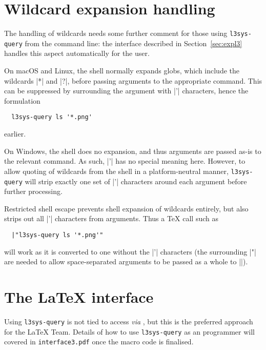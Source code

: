 \documentclass{l3doc}
\begin{document}
\begin{documentation}
\section{Wildcard expansion handling\label{sec:wildcard}}

The handling of wildcards needs some further comment for those using
\texttt{l3sys-query} from the command line: the  interface described
in Section~\ref{sec:expl3} handles this aspect automatically for the user.

On macOS and Linux, the shell normally expands globs, which include the
wildcards |*| and |?|, before passing arguments to the appropriate command. This
can be suppressed by surrounding the argument with |'| characters, hence the
formulation
\begin{verbatim}
  l3sys-query ls '*.png'
\end{verbatim}
earlier.

On Windows, the shell does no expansion, and thus arguments are passed as-is to
the relevant command. As such, |'| has no special meaning here. However, to
allow quoting of wildcards from the shell in a platform-neutral manner,
\texttt{l3sys-query} will strip exactly one set of |'| characters around each
argument before further processing.

Restricted shell escape prevents shell expansion of wildcards entirely, but
also strips out all |'| characters from arguments. Thus a \TeX{} call such as
\begin{verbatim}
  |"l3sys-query ls '*.png'"
\end{verbatim}
will work as it is converted to one without the |'| characters (the surrounding
|"| are needed to allow space-separated arguments to be passed as a whole to
||).

\section{The \LaTeX{} interface\label{sec:expl3}}

Using \texttt{l3sys-query} is not tied to access \emph{via} , but
this is the preferred approach for the \LaTeX{} Team. Details of how to use
\texttt{l3sys-query} as an  programmer will covered in
\texttt{interface3.pdf} once the macro code is finalised.

\end{documentation}

\PrintIndex
\end{document}

